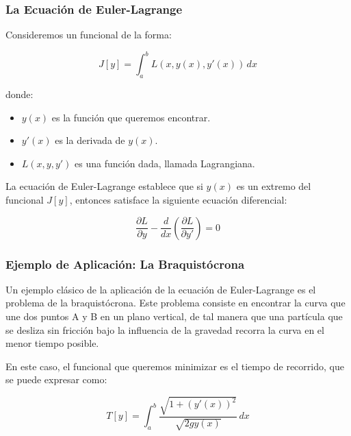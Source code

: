\subsubsection{La Ecuación de Euler-Lagrange}

Consideremos un funcional de la forma:

\begin{equation}
	J[y] = \int_a^b L(x, y(x), y'(x)) \, dx
\end{equation}

donde:

\begin{itemize}
	\item $y(x)$ es la función que queremos encontrar.
	\item $y'(x)$ es la derivada de $y(x)$.
	\item $L(x, y, y')$ es una función dada, llamada Lagrangiana.
\end{itemize}

La ecuación de Euler-Lagrange establece que si $y(x)$ es un extremo del funcional $J[y]$, entonces satisface la siguiente ecuación diferencial:

\begin{equation}
	\frac{\partial L}{\partial y} - \frac{d}{dx} \left( \frac{\partial L}{\partial y'} \right) = 0
\end{equation}

\subsubsection{Ejemplo de Aplicación: La Braquistócrona}

Un ejemplo clásico de la aplicación de la ecuación de Euler-Lagrange es el problema de la braquistócrona.  Este problema consiste en encontrar la curva que une dos puntos A y B en un plano vertical, de tal manera que una partícula que se desliza sin fricción bajo la influencia de la gravedad recorra la curva en el menor tiempo posible.


En este caso, el funcional que queremos minimizar es el tiempo de recorrido, que se puede expresar como:

\begin{equation}
	T[y] = \int_a^b \frac{\sqrt{1 + (y'(x))^2}}{\sqrt{2gy(x)}} \, dx
\end{equation}

